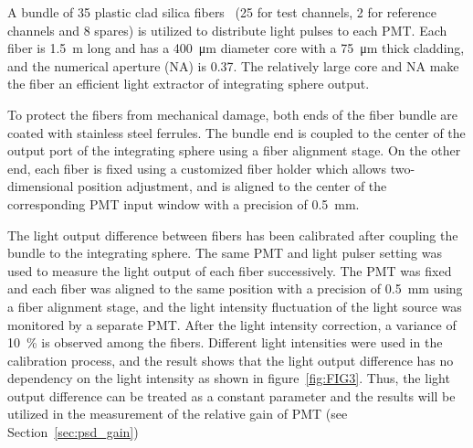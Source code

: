 \documentclass{JINST}
\begin{document}
A bundle of 35 plastic clad silica fibers~\cite{optical_fibre} (25 for test channels, 2 for reference channels and 8 spares) is utilized to distribute light pulses to each PMT.	Each fiber is \SI{1.5}{\meter} long and has a \SI{400}{\micro\meter} diameter core with a \SI{75}{\micro\meter} thick cladding, and the numerical aperture (NA) is 0.37.
The relatively large core and NA make the fiber an efficient light extractor of integrating sphere output. 
	
To protect the fibers from mechanical damage, both ends of the fiber bundle are coated with stainless steel ferrules.
The bundle end is coupled to the center of the output port of the integrating sphere using a fiber alignment stage.
On the other end, each fiber is fixed using a customized fiber holder which allows two-dimensional position adjustment, and is aligned to the center of the corresponding PMT input window with a precision of \SI{0.5}{\milli\meter}.
	
The light output difference between fibers has been calibrated after coupling the bundle to the integrating sphere.
The same PMT and light pulser setting was used to measure the light output of each fiber successively.
The PMT was fixed and each fiber was aligned to the same position with a precision of \SI{0.5}{\milli\meter} using a fiber alignment stage, and the light intensity fluctuation of the light source was monitored by a separate PMT.
After the light intensity correction, a variance of \SI{10}{\percent} is observed among the fibers.
Different light intensities were used in the calibration process, and the result shows that the light output difference has no dependency on the light intensity as shown in figure~\ref{fig:FIG3}. 
Thus, the light output difference can be treated as a constant parameter and the results will be utilized in the measurement of the relative gain of PMT (see Section~\ref{sec:psd_gain})
	
\end{document}

